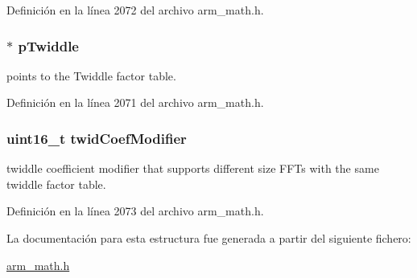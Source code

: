 Definición en la línea 2072 del archivo arm\+\_\+math.\+h.

\subsubsection[{\texorpdfstring{p\+Twiddle}{pTwiddle}}]{$\ast$ p\+Twiddle}\hypertarget{structarm__cfft__radix2__instance__f32_aca581481fccdff0f557f54a3ef20d967}{}\label{structarm__cfft__radix2__instance__f32_aca581481fccdff0f557f54a3ef20d967}
points to the Twiddle factor table. 

Definición en la línea 2071 del archivo arm\+\_\+math.\+h.

\subsubsection[{\texorpdfstring{twid\+Coef\+Modifier}{twidCoefModifier}}]{\setlength{\rightskip}{0pt plus 5cm}uint16\+\_\+t twid\+Coef\+Modifier}\hypertarget{structarm__cfft__radix2__instance__f32_afe772e5b5001c9d8e85032115a8df5bf}{}\label{structarm__cfft__radix2__instance__f32_afe772e5b5001c9d8e85032115a8df5bf}
twiddle coefficient modifier that supports different size F\+F\+Ts with the same twiddle factor table. 

Definición en la línea 2073 del archivo arm\+\_\+math.\+h.



La documentación para esta estructura fue generada a partir del siguiente fichero\+:\begin{DoxyCompactItemize}
\item 
\hyperlink{arm__math_8h}{arm\+\_\+math.\+h}\end{DoxyCompactItemize}
